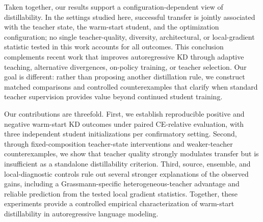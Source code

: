 Taken together, our results support a configuration-dependent view of distillability. In the settings studied here, successful transfer is jointly associated with the teacher state, the warm-start student, and the optimization configuration; no single teacher-quality, diversity, architectural, or local-gradient statistic tested in this work accounts for all outcomes. This conclusion complements recent work that improves autoregressive KD through adaptive teaching, alternative divergences, on-policy training, or teacher selection. Our goal is different: rather than proposing another distillation rule, we construct matched comparisons and controlled counterexamples that clarify when standard teacher supervision provides value beyond continued student training.

Our contributions are threefold. First, we establish reproducible positive and negative warm-start KD outcomes under paired CE-relative evaluation, with three independent student initializations per confirmatory setting. Second, through fixed-composition teacher-state interventions and weaker-teacher counterexamples, we show that teacher quality strongly modulates transfer but is insufficient as a standalone distillability criterion. Third, source, ensemble, and local-diagnostic controls rule out several stronger explanations of the observed gains, including a Grassmann-specific heterogeneous-teacher advantage and reliable prediction from the tested local gradient statistics. Together, these experiments provide a controlled empirical characterization of warm-start distillability in autoregressive language modeling.
